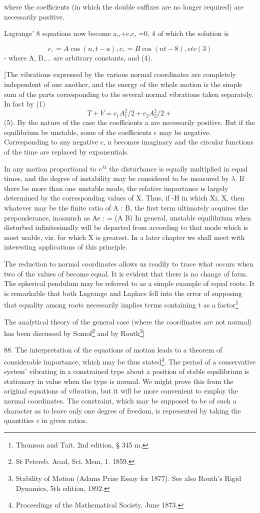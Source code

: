 where the coefficients (in which the double suffixes are no longer required)
are necessarily positive.

Lagrange' 8 equations now become a,,+c,c, =0, 4 of which the solution is

\[c,= A \cos(n,t - a), c, =B \cos(nt- 8), etc (3)\]
- where A, B,... are arbitrary constants, and (4).

[The vibrations expressed by the various normal coordinates are completely
independent of one another, and the energy of the whole motion is the simple
sum of the parts corresponding to the several normal vibrations taken
separately. In fact by (1)
\[ T + V = c_1 A_1^2/2  + c_2 A_2^2/2 + \]
(5).  By the nature of the case the coefficients a are necessarily positive.
But if the equilibrium be unstable, some of the coefficients c may be negative.
Corresponding to any negative c, n becomes imaginary and the circular functions
of the time are replaced by exponentials.

In any motion proportional to \(e^{\lambda t}\) the disturbance is equally
multiplied in equal times, and the degree of instability may be considered to
be measured by \(\lambda \). If there be more than one unstable mode, the
relative importance is largely determined by the corresponding values of X.
Thus, if -H in which Xi, X, then whatever may be the finite ratio of A : B,
the first term ultimately acquires the preponderance, inasmuch as Ae  : = (A B)
In general, unstable equilibrium when disturbed infinitesimally will be
departed from according to that mode which is most usable, viz. for which X is
greatest. In a later chapter we shall meet with interesting applications of
this principle.

The reduction to normal coordinates allows us readily to trace what occurs when
two of the values of become equal. It is evident that there is no change of
form. The spherical pendulum may be referred to as a simple example of equal
roots. It is remarkable that both Lagrange and Laplace fell into the error of
supposing that equality among roots necessarily implies terms containing t as a
factor\footnote{Thomson and Tait, 2nd edition, § 345 m.}

The analytical theory of the general case (where the coordinates are not
normal) has been discussed by Somof\footnote{St Petersb. Acad, Sci. Mem, 1.
1859.} and by Routh\footnote{Stability of Motion (Adams Prize Essay for 1877).
See also Routh’s Rigid Dynamics, 5th edition, 1892.}]

88. The interpretation of the equations of motion leads to a theorem of
considerable importance, which may be thus stated\footnote{Proceedings of the
Mathematical Society, June 1873.}.  The period of a conservative system'
vibrating in a constrained type about a position of stable equilibrium is
stationary in value when the type is normal. We might prove this from the
original equations of vibration, but it will be more convenient to employ the
normal coordinates. The constraint, which may be supposed to be of such a
character as to leave only one degree of freedom, is represented by taking the
quantities c in given ratios.

